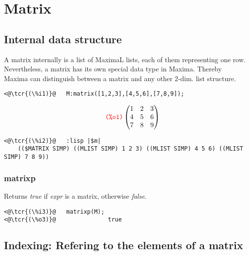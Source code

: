 \documentclass[../Maxima_Workbook.tex]{subfiles}
\begin{document}
\vspace{-4mm}\section{Matrix}

\subsection{Internal data structure}\label{LA9}

A matrix internally is a list of MaximaL lists, each of them representing one row. Nevertheless, a matrix has its own special data type in Maxima. Thereby Maxima can distinguish between a matrix and any other 2-dim. list structure.

\lz \begin{small}
\color{blue}
\begin{lstlisting}
<@\tcr{(\%i1)}@   M:matrix([1,2,3],[4,5,6],[7,8,9]);
\end{lstlisting}
\vspace{-3.5mm} \[\tag*{\tcr{\ttfamily (\%o1)}} \begin{pmatrix} 1 & 2 & 3 \\ 4 & 5 & 6 \\ 7 & 8 & 9 \end{pmatrix} \]
\vspace{-6mm}\begin{lstlisting}
<@\tcr{(\%i2)}@   :lisp |$m|
	(($MATRIX SIMP) ((MLIST SIMP) 1 2 3) ((MLIST SIMP) 4 5 6) ((MLIST SIMP) 7 8 9))
\end{lstlisting}
\color{black}
\end{small}

\subsubsection{matrixp}

\lz {} \hfill \tcr{[function]}

\lz Returns \emph{true} if \emph{expr} is a matrix, otherwise \emph{false}.

\lz \begin{small} \color{blue}
\begin{lstlisting}
<@\tcr{(\%i3)}@   matrixp(M);
<@\tcr{(\%o3)}@			      true
\end{lstlisting}
\color{black} \end{small}

\subsection{Indexing: Refering to the elements of a matrix}
\end{document}
